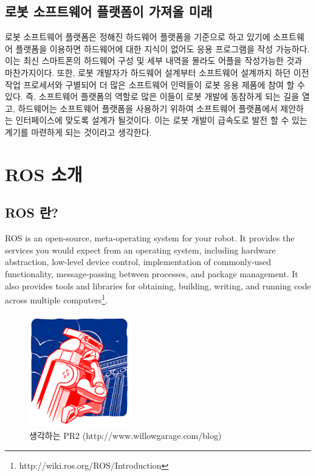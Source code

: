 \subsection{로봇 소프트웨어 플랫폼이 가져올 미래}

로봇 소프트웨어 플랫폼은 정해진 하드웨어 플랫폼을 기준으로 하고 있기에 소프트웨어 플랫폼을 이용하면 하드웨어에 대한 지식이 없어도 응용 프로그램을 작성 가능하다.
이는 최신 스마트폰의 하드웨어 구성 및 세부 내역을 몰라도 어플을 작성가능한 것과 마찬가지이다.
또한, 로봇 개발자가 하드웨어 설계부터 소프트웨어 설계까지 하던 이전 작업 프로세서와 구별되어 더 많은 소프트웨어 인력들이 로봇 응용 제품에 참여 할 수 있다.
즉, 소프트웨어 플랫폼의 역할로 많은 이들이 로봇 개발에 동참하게 되는 길을 열고, 하드웨어는 소프트웨어 플랫폼을 사용하기 위하여 소프트웨어 플랫폼에서 제안하는 인터페이스에 맞도록 설계가 될것이다.
이는 로봇 개발이 급속도로 발전 할 수 있는 계기를 마련하게 되는 것이라고 생각한다.

\section{ROS 소개}

\subsection{ROS 란?}

ROS is an open-source, meta-operating system for your robot.
It provides the services you would expect from an operating system, including hardware abstraction, low-level device control, implementation of commonly-used functionality, message-passing between processes, and package management.
It also provides tools and libraries for obtaining, building, writing, and running code across multiple computers\footnote{http://wiki.ros.org/ROS/Introduction}.

\begin{figure}[h]
\centering\includegraphics[width=0.2\columnwidth]{pictures/chapter1/think_pr2.png}
\caption{생각하는 PR2 (http://www.willowgarage.com/blog)}
\end{figure}

